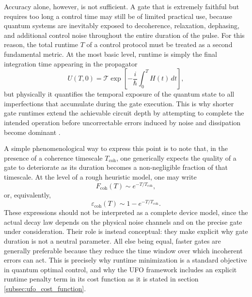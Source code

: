 Accuracy alone, however, is not sufficient. A gate that is extremely faithful but requires too long a control time may still be of limited practical use, because quantum systems are inevitably exposed to decoherence, relaxation, dephasing, and additional control noise throughout the entire duration of the pulse. For this reason, the total runtime $T$ of a control protocol must be treated as a second fundamental metric. At the most basic level, runtime is simply the final integration time appearing in the propagator
\begin{equation}
U(T,0)
=
\mathcal{T}
\exp\!\left[
-\frac{i}{\hbar}
\int_{0}^{T} H(t)\,dt
\right],
\label{eq:runtime_propagator}
\end{equation}
but physically it quantifies the temporal exposure of the quantum state to all imperfections that accumulate during the gate execution. This is why shorter gate runtimes extend the achievable circuit depth by attempting to complete the intended operation before uncorrectable errors induced by noise and dissipation become dominant \cite{Niu2019}.

A simple phenomenological way to express this point is to note that, in the presence of a coherence timescale $T_{\mathrm{coh}}$, one generically expects the quality of a gate to deteriorate as its duration becomes a non-negligible fraction of that timescale. At the level of a rough heuristic model, one may write
\begin{equation}
F_{\mathrm{coh}}(T)
\sim
e^{-T/T_{\mathrm{coh}}},
\label{eq:coherence_decay_heuristic}
\end{equation}
or, equivalently,
\begin{equation}
\varepsilon_{\mathrm{coh}}(T)
\sim
1-e^{-T/T_{\mathrm{coh}}}.
\label{eq:coherence_infidelity_heuristic}
\end{equation}
These expressions should not be interpreted as a complete device model, since the actual decay law depends on the physical noise channels and on the precise gate under consideration. Their role is instead conceptual: they make explicit why gate duration is not a neutral parameter. All else being equal, faster gates are generally preferable because they reduce the time window over which incoherent errors can act. This is precisely why runtime minimization is a standard objective in quantum optimal control, and why the UFO framework includes an explicit runtime penalty term in its cost function \cite{Niu2019,Koch2022} as it is stated in section \ref{subsec:ufo_cost_function}.

